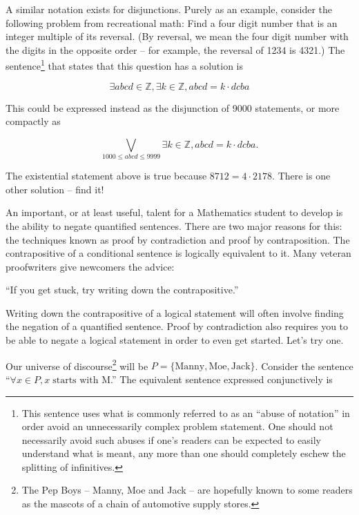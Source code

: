 A similar notation exists for disjunctions.  Purely as an example, consider
the following problem from recreational math: Find a four digit number that
is an integer multiple of its reversal.  (By reversal, we mean the four
digit number with the digits in the opposite order -- for example, the
reversal of 1234 is 4321.)  The sentence\footnote{This sentence uses what %
is commonly referred to as an ``abuse of notation'' in order avoid an %
unnecessarily complex problem statement.  One should not necessarily %
avoid such abuses if one's readers can be expected to easily understand %
what is meant, any more than one should completely eschew the splitting %
of infinitives.}
that states that this question has a solution is

\[
\exists abcd \in {\mathbb Z},  \exists k \in {\mathbb Z}, abcd = k\cdot dcba
\]

This could be expressed instead as the disjunction of 9000 statements, or more 
compactly as

\[
\bigvee_{1000\leq abcd \leq 9999}  \exists k \in {\mathbb Z}, abcd = k\cdot dcba.
\]

\begin{exer} The existential statement above is true because $8712 = 4\cdot 2178$.
There is one other solution -- find it!
\end{exer}

An important, or at least useful, talent for a Mathematics student to develop
is the ability to negate quantified sentences.  There are two major reasons for this:
the techniques known as proof by contradiction and proof by contraposition. 
The contrapositive of a conditional sentence is logically
equivalent to it.   Many veteran proofwriters give newcomers the advice:

``If you get stuck, try writing down the contrapositive.''

Writing down the contrapositive of a logical statement will often involve finding the
negation of a quantified sentence.  Proof by contradiction also requires you to be able to
negate a logical statement in order to even get started.  Let's try one.

Our universe of discourse\footnote{The Pep Boys -- Manny, Moe and %
Jack -- are hopefully known to some readers as the mascots of a chain %
of automotive supply stores.} 
will be $P = \{ \mbox{Manny}, \mbox{Moe}, \mbox{Jack} \}$.  
Consider the sentence 
``$\forall x \in P, x\; \mbox{starts with M}$.''   The equivalent sentence
expressed conjunctively is 

